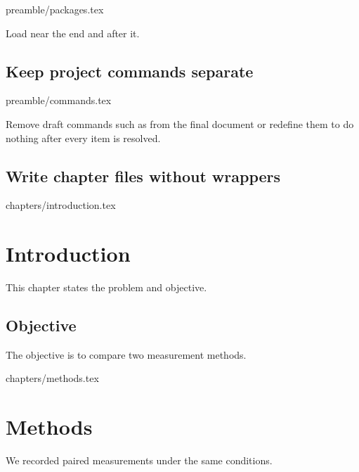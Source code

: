 \begin{latexcode}{preamble/packages.tex}
\usepackage{amsmath}
\usepackage{booktabs}
\usepackage{graphicx}
\usepackage{siunitx}
\usepackage{hyperref}
\usepackage[nameinlink,noabbrev]{cleveref}
\end{latexcode}

Load  near the end and  after it.

\section{Keep project commands separate}

\begin{latexcode}{preamble/commands.tex}
\newcommand{\species}[1]{\textit{#1}}
\newcommand{\projecttitle}{Measurement Study}
\newcommand{\todo}[1]{\textbf{TODO: #1}}
\end{latexcode}

Remove draft commands such as  from the final document or redefine
them to do nothing after every item is resolved.

\section{Write chapter files without wrappers}

\begin{latexcode}{chapters/introduction.tex}
\chapter{Introduction}
\label{chap:introduction}

This chapter states the problem and objective.

\section{Objective}
The objective is to compare two measurement methods.
\end{latexcode}

\begin{latexcode}{chapters/methods.tex}
\chapter{Methods}
\label{chap:methods}

We recorded paired measurements under the same conditions.
\end{latexcode}

